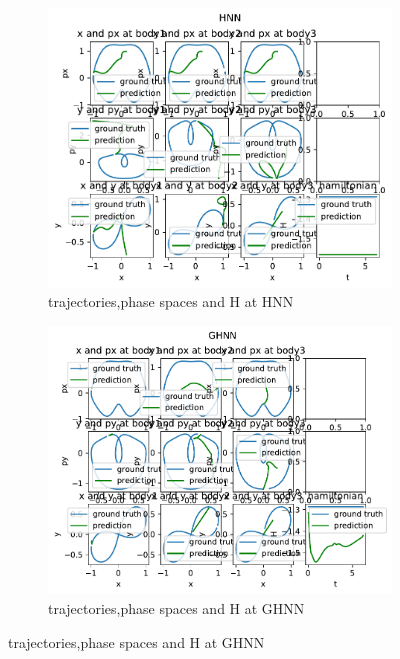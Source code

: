 \begin{figure}[H]
	\centering
	\begin{subfigure}[b]{0.3\textwidth}
		\centering
		\includegraphics[width=\textwidth]{chapters/chapter5/div_hnn_traj.pdf}
		\caption{trajectories,phase spaces and H at HNN}
	\end{subfigure}
	\hfill
	\begin{subfigure}[b]{0.3\textwidth}
		\centering
		\includegraphics[width=\textwidth]{chapters/chapter5/fig_ghnn_traj.pdf}
		\caption{trajectories,phase spaces and H at GHNN}

\end{subfigure}
\end{figure}
